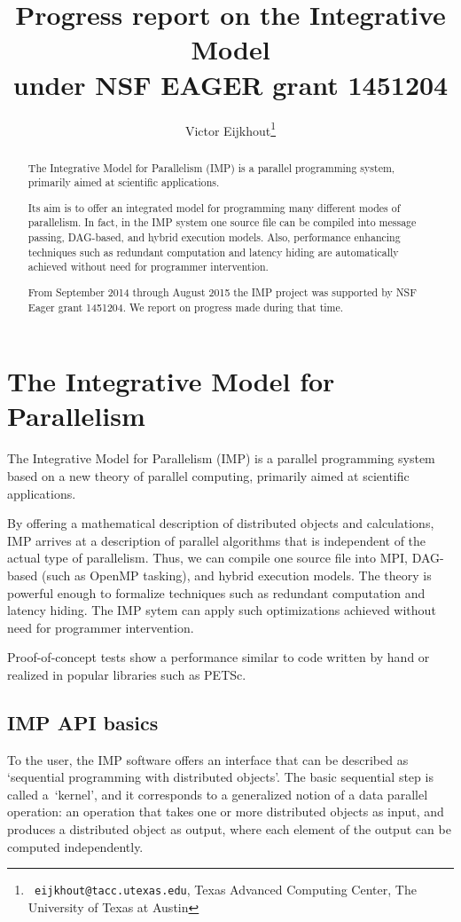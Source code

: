\documentclass[11pt,fleqn,preprint]{impreport}
\title[IMP progress 2014/15]{Progress report on the Integrative Model\\ under NSF EAGER grant 1451204}
\author[Eijkhout]{Victor Eijkhout\thanks{{\tt
      eijkhout@tacc.utexas.edu}, Texas Advanced Computing Center, The
    University of Texas at Austin}}
\begin{document}
\maketitle

\begin{abstract}
  The Integrative Model for Parallelism (IMP) is a parallel programming
  system, primarily aimed at scientific applications.

  Its aim is to offer an integrated model for programming many
  different modes of parallelism. In fact, in the IMP system one
  source file can be compiled into message passing, \acl{DAG}-based,
  and hybrid execution models. Also, performance enhancing techniques
  such as redundant computation and latency hiding are automatically
  achieved without need for programmer intervention.

  From September 2014 through August 2015 the IMP project
  was supported by NSF Eager grant 1451204. We report on
  progress made during that time.
\end{abstract}

\acresetall

\section{The Integrative Model for Parallelism}

The Integrative Model for Parallelism (IMP) is a parallel programming
system based on a new theory of parallel computing,
primarily aimed at scientific applications.

By offering a mathematical description of distributed objects
and calculations, IMP arrives at a description of parallel algorithms
that is independent of the actual type of parallelism. 
Thus, we can compile one source file into MPI, \ac{DAG}-based
(such as OpenMP tasking), and hybrid
execution models. The theory is powerful enough to formalize techniques
such as redundant computation and latency hiding.
The IMP sytem can apply such optimizations achieved without
need for programmer intervention.

Proof-of-concept tests show a performance similar to code written
by hand or realized in popular libraries such as PETSc.

\subsection{IMP API basics}

To the user, the IMP software
offers an interface that can be described as `sequential programming
with distributed objects'. The basic sequential step is called a~`kernel',
and it corresponds to a generalized notion of a data parallel operation:
an operation that takes one or more distributed objects as input,
and produces a distributed object as output, where each element of the output
can be computed independently.
\end{document}
